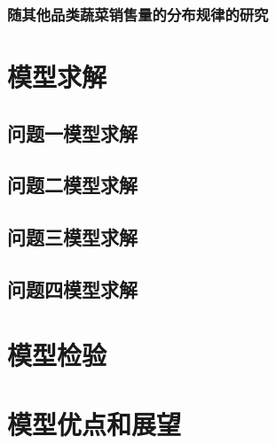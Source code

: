 \documentclass{article}
\begin{document}
\subsubsection{随其他品类蔬菜销售量的分布规律的研究}

\section{模型求解}


\subsection{问题一模型求解}

\subsection{问题二模型求解}

\subsection{问题三模型求解}

\subsection{问题四模型求解}


\section{模型检验}

\section{模型优点和展望}
\end{document}
